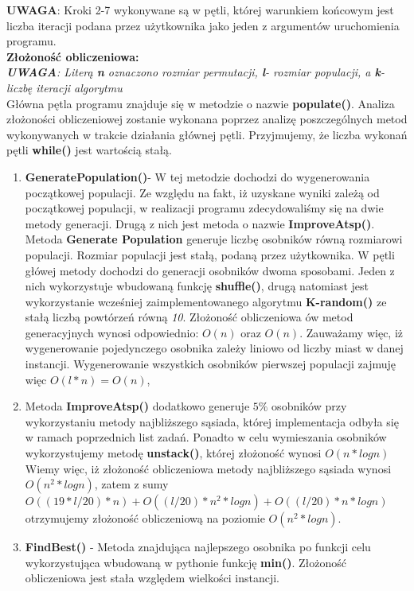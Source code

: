   \textbf{UWAGA}: Kroki 2-7 wykonywane są w pętli, której warunkiem końcowym jest liczba iteracji podana przez użytkownika jako jeden z argumentów uruchomienia programu. \\
 \textbf{Złożoność obliczeniowa: } \\
  \textit{\textbf{UWAGA}: Literą \textbf{n} oznaczono rozmiar permutacji, \textbf{l}- rozmiar populacji, a \textbf{k}- liczbę iteracji algorytmu} \\
  Główna pętla programu znajduje się w metodzie o nazwie \textbf{populate()}. Analiza złożoności obliczeniowej zostanie wykonana
  poprzez analizę poszczególnych metod wykonywanych w trakcie działania głównej pętli. Przyjmujemy, że liczba wykonań pętli \textbf{while()}
  jest wartością stałą.
  \begin{enumerate}
    \item \textbf{GeneratePopulation()}- W tej metodzie dochodzi do wygenerowania początkowej populacji. Ze względu na fakt,
    iż uzyskane wyniki zależą od początkowej populacji, w realizacji programu zdecydowaliśmy się na dwie metody generacji.
    Drugą z nich jest metoda o nazwie \textbf{ImproveAtsp()}. Metoda \textbf{Generate Population} generuje liczbę osobników równą rozmiarowi populacji. Rozmiar populacji jest stałą, podaną przez użytkownika.
    W pętli główej metody dochodzi do generacji osobników dwoma sposobami. Jeden z nich wykorzystuje wbudowaną funkcję \textbf{shuffle()}, drugą natomiast jest wykorzystanie wcześniej zaimplementowanego algorytmu
    \textbf{K-random()} ze stałą liczbą powtórzeń równą \textit{10}. Złożoność obliczeniowa ów metod generacyjnych wynosi odpowiednio: $O(n)$ oraz $O(n)$.
    Zauważamy więc, iż wygenerowanie pojedynczego osobnika zależy liniowo od liczby miast w danej instancji.
    Wygenerowanie wszystkich osobników pierwszej populacji zajmuję więc $O(l*n) = O(n)$,\\
    \item Metoda \textbf{ImproveAtsp()} dodatkowo generuje $5\%$ osobników przy wykorzystaniu metody najbliższego sąsiada, której implementacja odbyła się w ramach poprzednich list zadań. Ponadto w celu wymieszania osobników wykorzystujemy metodę \textbf{unstack()}, której złożoność wynosi $O(n*logn)$
    Wiemy więc, iż złożoność obliczeniowa metody najbliższego sąsiada wynosi $O(n^2*logn)$, zatem z sumy $O((19*l/20)*n) + O((l/20)*n^{2}*logn) + O((l/20)*n*logn)$ otrzymujemy złożoność obliczeniową na poziomie $O(n^{2}*logn)$.
    \item \textbf{FindBest()} - Metoda znajdująca najlepszego osobnika po funkcji celu wykorzystująca wbudowaną w pythonie funkcję \textbf{min()}. Złożoność obliczeniowa jest stała względem wielkości instancji.

\end{enumerate}
